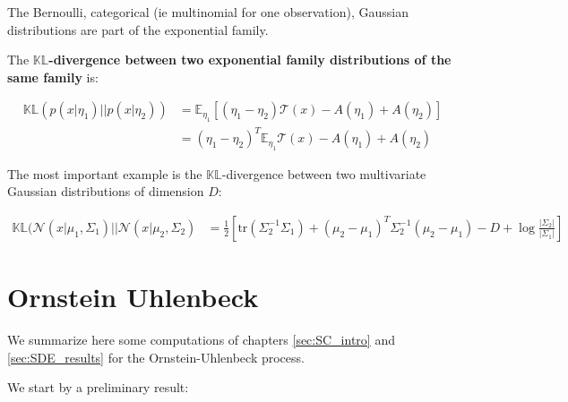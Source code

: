 The Bernoulli, categorical (ie multinomial for one observation), Gaussian distributions are part of the exponential family.

The \textbf{$\mathbb{KL}$-divergence between two exponential family distributions of the same family} is:

\begin{align}
    \mathbb{KL}(p(x\vert \eta_1) \vert \vert p(x \vert \eta_2)) &= \mathbb{E}_{\eta_1}\left[ (\eta_1 - \eta_2) \mathcal{T}(x) - A(\eta_1) + A(\eta_2)\right] \\
    &= (\eta_1 - \eta_2)^T \mathbb{E}_{\eta_1}\mathcal{T}(x) - A(\eta_1) + A(\eta_2)
\end{align}

The most important example is the $\mathbb{KL}$-divergence between two multivariate Gaussian distributions of dimension $D$:

\begin{tcolorbox}[colback=blue!5!white,colframe=black!75!black,title=KL between two multivariate Gaussians of dimension $D$]
\begin{align}
    \label{KL-two-gaussians}
    \mathbb{KL}(\mathcal{N}(x \vert \mu_1, \Sigma_1) \vert\vert \mathcal{N}(x \vert \mu_2, \Sigma_2) &=
    \frac{1}{2}\left[ \text{tr}(\Sigma_2^{-1}\Sigma_1) + (\mu_2-\mu_1)^T \Sigma_2^{-1}(\mu_2-\mu_1) -D + \log{\frac{\vert \Sigma_2\vert}{\vert \Sigma_1 \vert}}\right]
\end{align}
\end{tcolorbox}



\chapter{Ornstein Uhlenbeck}\label{Ornstein Uhlenbeck}

We summarize here some computations of chapters \ref{sec:SC_intro} and \ref{sec:SDE_results} for the Ornstein-Uhlenbeck process.

We start by a preliminary result:

